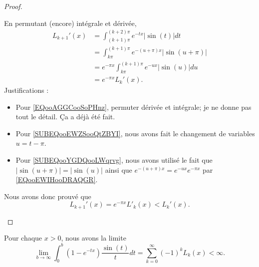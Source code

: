 \begin{proof}
\begin{subproof}
            En permutant (encore) intégrale et dérivée,
            \begin{subequations}
                \begin{align}
                    L_{k+1}'(x)&=\int_{(k+1)\pi}^{(k+2)\pi} e^{-tx}| \sin(t) |dt        \label{EQooAGGCooSoPHnz}\\
                    &=\int_{k\pi}^{(k+1)\pi} e^{-(u+\pi)x}| \sin(u+\pi) |       \label{SUBEQooEWZSooQtZBYI}\\
                    &= e^{-\pi x}\int_{k\pi}^{(k+1)\pi} e^{-ux}| \sin(u) |du    \label{SUBEQooYGDQooLWqrvg}\\
                    &= e^{-\pi x}L_k'(x).
                \end{align}
            \end{subequations}
            Justifications :
            \begin{itemize}
                \item Pour \eqref{EQooAGGCooSoPHnz}, permuter dérivée et intégrale; je ne donne pas tout le détail. Ça a déjà été fait.
                \item Pour \eqref{SUBEQooEWZSooQtZBYI}, nous avons fait le changement de variables \( u=t-\pi\).
                \item Pour \eqref{SUBEQooYGDQooLWqrvg}, nous avons utilisé le fait que \( | \sin(u+\pi) |=| \sin(u) |\) ainsi que \(  e^{-(u+\pi)x}= e^{-ux} e^{-\pi x}\) par \eqref{EQooEWIHooDRAQGR}.
            \end{itemize}
            Nous avons donc prouvé que
            \begin{equation}
                L_{k+1}'(x)= e^{-\pi x}L'_{k}(x)<L_k'(x).
            \end{equation}
    \end{subproof}
\end{proof}

\begin{lemma}       \label{LEMooSWFDooGLfwoD}
    Pour chaque \( x>0\), nous avons la limite
    \begin{equation}
        \lim_{b\to \infty} \int_0^{b}(1- e^{-tx})\frac{ \sin(t) }{ t }dt=\sum_{k=0}^{\infty}(-1)^kL_k(x)<\infty.
    \end{equation}
\end{lemma}

